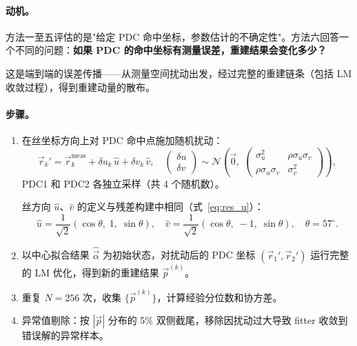 \documentclass[a4paper, 11pt]{article}
\begin{document}
\paragraph{动机。}
方法一至五评估的是"给定 PDC 命中坐标，参数估计的不确定性"。方法六回答一个不同的问题：\textbf{如果 PDC 的命中坐标有测量误差，重建结果会变化多少？}

这是端到端的误差传播——从测量空间扰动出发，经过完整的重建链条（包括 LM 收敛过程），得到重建动量的散布。

\paragraph{步骤。}
\begin{enumerate}[nosep]
  \item 在丝坐标方向上对 PDC 命中点施加随机扰动：
  \begin{equation}
    \vec{r}_k' = \vec{r}_k^\mathrm{meas} + \delta u_k \, \hat{u} + \delta v_k \, \hat{v},
    \quad
    \begin{pmatrix} \delta u \\ \delta v \end{pmatrix}
    \sim \mathcal{N}\!\left(\vec{0},\;
    \begin{pmatrix} \sigma_u^2 & \rho\sigma_u\sigma_v \\ \rho\sigma_u\sigma_v & \sigma_v^2 \end{pmatrix}
    \right),
  \end{equation}
  PDC1 和 PDC2 各独立采样（共 4 个随机数）。

  丝方向 $\hat{u}$、$\hat{v}$ 的定义与残差构建中相同（式~\eqref{eq:res_u}）：
  \begin{equation}
    \hat{u} = \frac{1}{\sqrt{2}}(\cos\theta,\; 1,\; \sin\theta), \quad
    \hat{v} = \frac{1}{\sqrt{2}}(\cos\theta,\; -1,\; \sin\theta), \quad \theta = 57^\circ.
  \end{equation}

  \item 以中心拟合结果 $\hat{\vec{\alpha}}$ 为初始状态，对扰动后的 PDC 坐标 $(\vec{r}_1', \vec{r}_2')$ 运行完整的 LM 优化，得到新的重建结果 $\vec{p}^{(k)}$。

  \item 重复 $N = 256$ 次，收集 $\{\vec{p}^{(k)}\}$，计算经验分位数和协方差。

  \item 异常值剔除：按 $|\vec{p}|$ 分布的 5\% 双侧截尾，移除因扰动过大导致 fitter 收敛到错误解的异常样本。
\end{enumerate}
\end{document}
